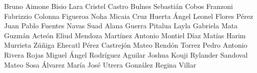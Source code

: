 Bruno Aimone Bisio Lara
Cristel Castro Bulnes
Sebastián Cobos Franzoni
Fabrizzio Colonna Figueroa
Noha Micaia Cruz Huerta
Ángel Leonel Flores Pérez
Juan Pablo Fuentes Navas
Suad Alana Guerra Pitalua
Layla Gabriela Mata Guzmán
Acteón Eliud Mendoza Martínez
Antonio Montiel Díaz
Matías Harim Murrieta Zúñiga
Ehecatl Pérez Castrejón
Mateo Rendón Torrez
Pedro Antonio Rivera Rojas
Miguel Ángel Rodríguez Aguilar
Joshua Kouji Rylander Sandoval
Mateo Sosa Álvarez
María José Utrera González
Regina Villar